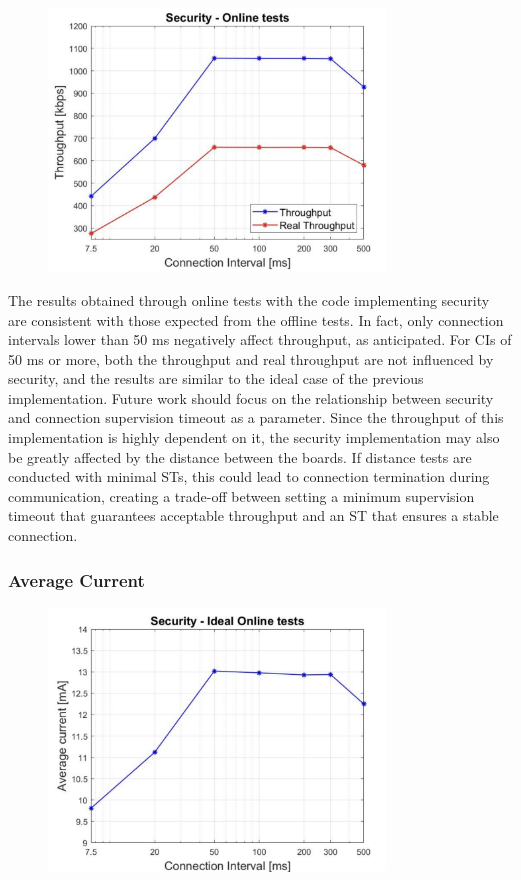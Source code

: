 \documentclass{Configuration_Files/PoliMi3i_thesis}
\begin{document}
\begin{figure}[h!]
    \centering
    \includegraphics[width=0.8\textwidth]{Results Manuel/figure12}
    \label{fig:figure1}
\end{figure}

The results obtained through online tests with the code implementing security are consistent with those expected from the offline tests. In fact, only connection intervals lower than 50 ms negatively affect throughput, as anticipated. For CIs of 50 ms or more, both the throughput and real throughput are not influenced by security, and the results are similar to the ideal case of the previous implementation. Future work should focus on the relationship between security and connection supervision timeout as a parameter. Since the throughput of this implementation is highly dependent on it, the security implementation may also be greatly affected by the distance between the boards. If distance tests are conducted with minimal STs, this could lead to connection termination during communication, creating a trade-off between setting a minimum supervision timeout that guarantees acceptable throughput and an ST that ensures a stable connection.

\subsubsection*{Average Current}

\begin{figure}[h!]
    \centering
    \includegraphics[width=0.8\textwidth]{Results Manuel/figure13}
    \label{fig:figure1}
\end{figure}
\end{document}
